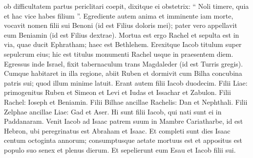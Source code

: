 \begin{biblechapter}
\begin{biblechapter}
\begin{biblechapter}
\begin{biblechapter}
\begin{biblechapter}
\begin{biblechapter}
\begin{biblechapter}
\begin{biblechapter}
\begin{biblechapter}
\begin{biblechapter}
\begin{biblechapter}
\begin{biblechapter}
\begin{biblechapter}
\begin{biblechapter}
\begin{biblechapter}
\begin{biblechapter}
\begin{biblechapter}
\begin{biblechapter}
\begin{biblechapter}
\begin{biblechapter}
\begin{biblechapter}
\begin{biblechapter}
\begin{biblechapter}
\begin{biblechapter}
\begin{biblechapter}
\begin{biblechapter}
\begin{biblechapter}
\begin{biblechapter}
\begin{biblechapter}
\begin{biblechapter}
\begin{biblechapter}
\begin{biblechapter}
\begin{biblechapter}
\begin{biblechapter}
\begin{biblechapter}
\verse ob difficultatem partus periclitari coepit, dixitque ei obstetrix: “ Noli timere, quia et hac vice habes filium ”. 
\verse Egrediente autem anima et imminente iam morte, vocavit nomen filii sui Benoni (id est Filius doloris mei); pater vero appellavit eum Beniamin (id est Filius dextrae).
 \verse Mortua est ergo Rachel et sepulta est in via, quae ducit Ephratham; haec est Bethlehem. 
\verse Erexitque Iacob titulum super sepulcrum eius; hic est titulus monumenti Rachel usque in praesentem diem.
 \verse Egressus inde Israel, fixit tabernaculum trans Magdaleder (id est Turris gregis). 
\verse Cumque habitaret in illa regione, abiit Ruben et dormivit cum Bilha concubina patris sui; quod illum minime latuit.
 Erant autem filii Iacob duodecim. 
\verse Filii Liae: primogenitus Ruben et Simeon et Levi et Iudas et Issachar et Zabulon. 
\verse Filii Rachel: Ioseph et Beniamin. 
\verse Filii Bilhae ancillae Rachelis: Dan et Nephthali. 
\verse Filii Zelphae ancillae Liae: Gad et Aser. Hi sunt filii Iacob, qui nati sunt ei in Paddanaram.
 \verse Venit Iacob ad Isaac patrem suum in Mambre Cariatharbe, id est Hebron, ubi peregrinatus est Abraham et Isaac.
 \verse Et completi sunt dies Isaac centum octoginta annorum; 
\verse consumptusque aetate mortuus est et appositus est populo suo senex et plenus dierum. Et sepelierunt eum Esau et Iacob filii sui.
 

\end{biblechapter}
\end{biblechapter}
\end{biblechapter}
\end{biblechapter}
\end{biblechapter}
\end{biblechapter}
\end{biblechapter}
\end{biblechapter}
\end{biblechapter}
\end{biblechapter}
\end{biblechapter}
\end{biblechapter}
\end{biblechapter}
\end{biblechapter}
\end{biblechapter}
\end{biblechapter}
\end{biblechapter}
\end{biblechapter}
\end{biblechapter}
\end{biblechapter}
\end{biblechapter}
\end{biblechapter}
\end{biblechapter}
\end{biblechapter}
\end{biblechapter}
\end{biblechapter}
\end{biblechapter}
\end{biblechapter}
\end{biblechapter}
\end{biblechapter}
\end{biblechapter}
\end{biblechapter}
\end{biblechapter}
\end{biblechapter}
\end{biblechapter}
